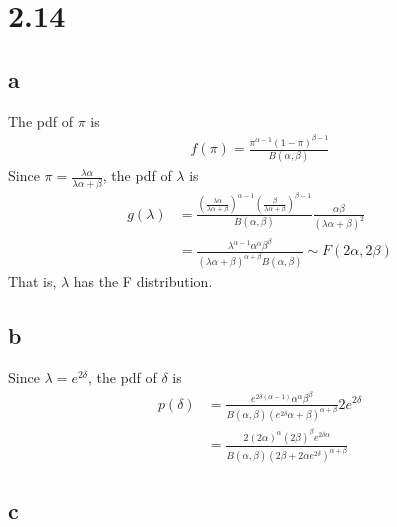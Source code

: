 \documentclass[11pt]{article}
\begin{document}
    \hypertarget{section}{%
\section{2.14}\label{section}}

    \hypertarget{a}{%
\subsection{a}\label{a}}

    The pdf of \(\pi\) is \[\begin{align}
    f(\pi)=\frac{\pi^{\alpha-1}(1-\pi)^{\beta-1}}{B(\alpha,\beta)}
\end{align}\] Since \(\pi=\frac{\lambda\alpha}{\lambda\alpha+\beta}\),
the pdf of \(\lambda\) is \[\begin{align}
    g(\lambda)&= \frac{(\frac{\lambda\alpha}{\lambda\alpha+\beta})^{\alpha-1}(\frac{\beta}{\lambda\alpha+\beta})^{\beta-1}}{B(\alpha,\beta)}\frac{\alpha\beta}{(\lambda\alpha+\beta)^2} \\
    &= \frac{\lambda^{\alpha-1}\alpha^{\alpha}\beta^{\beta}}{(\lambda\alpha+\beta)^{\alpha+\beta}B(\alpha,\beta)} \sim F(2\alpha,2\beta)
\end{align}\] That is, \(\lambda\) has the F distribution.

    \hypertarget{b}{%
\subsection{b}\label{b}}

    Since \(\lambda=e^{2\delta}\), the pdf of \(\delta\) is \[\begin{align}
    p(\delta)&=\frac{e^{2\delta(\alpha-1)}\alpha^{\alpha}\beta^{\beta}}{B(\alpha, \beta)(e^{2\delta}\alpha+\beta)^{\alpha+\beta}}2e^{2\delta} \\
    &= \frac{2(2\alpha)^{\alpha}(2\beta)^{\beta}e^{2\delta\alpha}}{B(\alpha,\beta)(2\beta+2\alpha e^{2\delta})^{\alpha+\beta}}
\end{align}\]

    \hypertarget{c}{%
\subsection{c}\label{c}}
\end{document}
